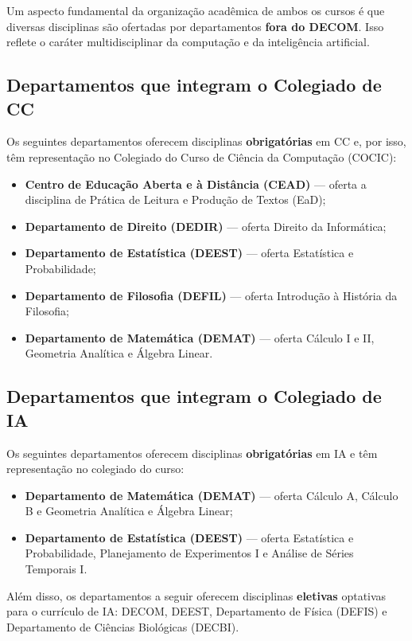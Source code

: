 \documentclass[9pt,a4paper]{extarticle}
\begin{document}
Um aspecto fundamental da organização acadêmica de ambos os cursos é que diversas disciplinas são ofertadas por departamentos \textbf{fora do DECOM}. Isso reflete o caráter multidisciplinar da computação e da inteligência artificial.

\subsection{Departamentos que integram o Colegiado de CC}

Os seguintes departamentos oferecem disciplinas \textbf{obrigatórias} em CC e, por isso, têm representação no Colegiado do Curso de Ciência da Computação (COCIC):

\begin{itemize}
  \item \textbf{Centro de Educação Aberta e à Distância (CEAD)} --- oferta a disciplina de Prática de Leitura e Produção de Textos (EaD);
  \item \textbf{Departamento de Direito (DEDIR)} --- oferta Direito da Informática;
  \item \textbf{Departamento de Estatística (DEEST)} --- oferta Estatística e Probabilidade;
  \item \textbf{Departamento de Filosofia (DEFIL)} --- oferta Introdução à História da Filosofia;
  \item \textbf{Departamento de Matemática (DEMAT)} --- oferta Cálculo I e II, Geometria Analítica e Álgebra Linear.
\end{itemize}

\subsection{Departamentos que integram o Colegiado de IA}

Os seguintes departamentos oferecem disciplinas \textbf{obrigatórias} em IA e têm representação no colegiado do curso:

\begin{itemize}
  \item \textbf{Departamento de Matemática (DEMAT)} --- oferta Cálculo A, Cálculo B e Geometria Analítica e Álgebra Linear;
  \item \textbf{Departamento de Estatística (DEEST)} --- oferta Estatística e Probabilidade, Planejamento de Experimentos I e Análise de Séries Temporais I.
\end{itemize}

Além disso, os departamentos a seguir oferecem disciplinas \textbf{eletivas} optativas para o currículo de IA: DECOM, DEEST, Departamento de Física (DEFIS) e Departamento de Ciências Biológicas (DECBI).
\end{document}

